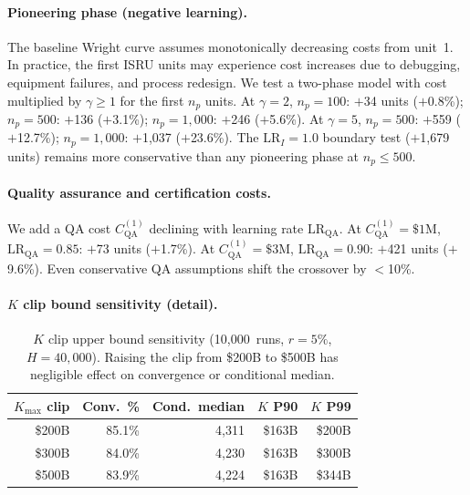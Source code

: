 \documentclass[preprint,12pt]{elsarticle}
\begin{document}
\paragraph{Pioneering phase (negative learning).} The baseline Wright curve assumes monotonically decreasing costs from unit~1. In practice, the first ISRU units may experience cost increases due to debugging, equipment failures, and process redesign. We test a two-phase model with cost multiplied by $\gamma \geq 1$ for the first $n_p$ units. At $\gamma = 2$, $n_p = 100$: $+$34 units ($+$0.8\%); $n_p = 500$: $+$136 ($+$3.1\%); $n_p = 1{,}000$: $+$246 ($+$5.6\%). At $\gamma = 5$, $n_p = 500$: $+$559 ($+$12.7\%); $n_p = 1{,}000$: $+$1{,}037 ($+$23.6\%). The $\mathrm{LR}_I = 1.0$ boundary test ($+$1{,}679 units) remains more conservative than any pioneering phase at $n_p \leq 500$.

\paragraph{Quality assurance and certification costs.} We add a QA cost $C_{\mathrm{QA}}^{(1)}$ declining with learning rate $\mathrm{LR}_{\mathrm{QA}}$. At $C_{\mathrm{QA}}^{(1)} = \$1$M, $\mathrm{LR}_{\mathrm{QA}} = 0.85$: $+$73 units ($+$1.7\%). At $C_{\mathrm{QA}}^{(1)} = \$3$M, $\mathrm{LR}_{\mathrm{QA}} = 0.90$: $+$421 units ($+$9.6\%). Even conservative QA assumptions shift the crossover by $<$10\%.

\paragraph{$K$ clip bound sensitivity (detail).}

\begin{table}[htbp]
\centering
\caption{$K$ clip upper bound sensitivity (10{,}000~runs, $r = 5\%$, $H = 40{,}000$). Raising the clip from \$200B to \$500B has negligible effect on convergence or conditional median.}
\label{tab:k_clip}
\small
\begin{tabular}{@{}rrrrr@{}}
\toprule
$K_{\max}$ clip & Conv.\ \% & Cond.\ median & $K$ P90 & $K$ P99 \\
\midrule
\$200B & 85.1\% & 4{,}311 & \$163B & \$200B \\
\$300B & 84.0\% & 4{,}230 & \$163B & \$300B \\
\$500B & 83.9\% & 4{,}224 & \$163B & \$344B \\
\bottomrule
\end{tabular}
\end{table}
\end{document}
